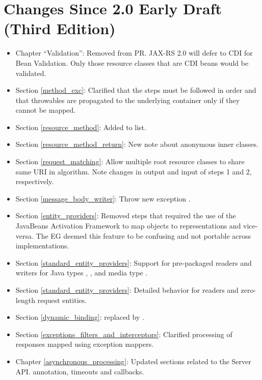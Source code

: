 \section{Changes Since 2.0 Early Draft (Third Edition)}

\begin{itemize}
\item Chapter ``Validation'': Removed from PR. JAX-RS 2.0 will defer to CDI for Bean Validation. Only those resource classes that are CDI beans would be validated.
\item Section \ref{method_exc}: Clarified that the steps must be followed in order and that throwables are propagated to the underlying container only if they cannot be mapped.
\item Section \ref{resource_method}: Added  to list.
\item Section \ref{resource_method_return}: New note about anonymous inner classes.
\item Section \ref{request_matching}: Allow multiple root resource classes to share same URI in algorithm. Note changes in output and input of steps 1 and 2, respectively.
\item Section \ref{message_body_writer}: Throw new exception  .
\item Section \ref{entity_providers}: Removed steps that required the use of the JavaBeans Activation Framework\cite{jaf} to map objects to representations and vice-versa. The EG deemed this feature to be confusing and not portable across implementations.
\item Section \ref{standard_entity_providers}: Support for pre-packaged readers and writers for Java types , ,  and media type .
\item Section \ref{standard_entity_providers}: Detailed behavior for readers and zero-length request entities.
\item Section \ref{dynamic_binding}:  replaced by .
\item Section \ref{exceptions_filters_and_interceptors}: Clarified processing of responses mapped using exception mappers. 
\item Chapter \ref{asynchronous_processing}: Updated sections related to the Server API.  annotation, timeouts and callbacks.

\end{itemize}
